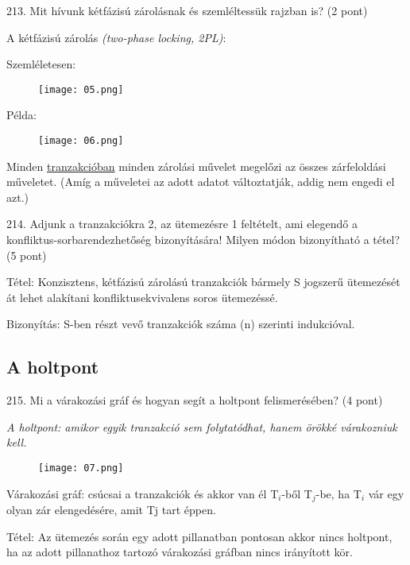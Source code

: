 \documentclass[a4paper,11.5pt, table]{article}
\begin{document}
213. Mit hívunk kétfázisú zárolásnak és szemléltessük rajzban is? (2 pont)
	\begin{compactitem}
		\item A kétfázisú zárolás\textit{ (two-phase locking, 2PL)}:
		\begin{compactitem}
			\item Szemléletesen:
			\begin{figure}[h]
				\centering
				\texttt{[image: 05.png]}
			\end{figure}
		\item Példa:
			\begin{figure}[h]
				\centering
				\texttt{[image: 06.png]}
			\end{figure}
			\item Minden \underline{tranzakcióban} minden zárolási művelet megelőzi az összes zárfeloldási műveletet. (Amíg a műveletei az adott adatot változtatják, addig nem engedi el azt.)
		\end{compactitem}
	\end{compactitem}

214. Adjunk a tranzakciókra 2, az ütemezésre 1 feltételt, ami elegendő a konfliktus-sorbarendezhetőség bizonyítására! Milyen módon bizonyítható a tétel? (5 pont)
	\begin{compactitem}
		\item Tétel: Konzisztens, kétfázisú zárolású tranzakciók bármely S jogszerű ütemezését át lehet alakítani konfliktusekvivalens soros ütemezéssé. 
		\item Bizonyítás: S-ben részt vevő tranzakciók száma (n) szerinti indukcióval. 		
	\end{compactitem}
	
\subsection{A holtpont}
	
215. Mi a várakozási gráf és hogyan segít a holtpont felismerésében? (4 pont)
	\begin{compactitem}
		\item \textit{A holtpont: amikor egyik tranzakció sem folytatódhat, hanem örökké várakozniuk kell.} 
		\begin{figure}[h]
			\centering
			\texttt{[image: 07.png]}
		\end{figure}
		\item Várakozási gráf: csúcsai a tranzakciók és akkor van él T$ _{i} $-ből T$ _{j} $-be, ha T$ _{i} $ vár egy olyan zár elengedésére, amit Tj tart éppen.
		\item Tétel: Az ütemezés során egy adott pillanatban pontosan akkor nincs holtpont, ha az adott pillanathoz tartozó várakozási gráfban nincs irányított kör.		
	\end{compactitem}
		
\end{document}
